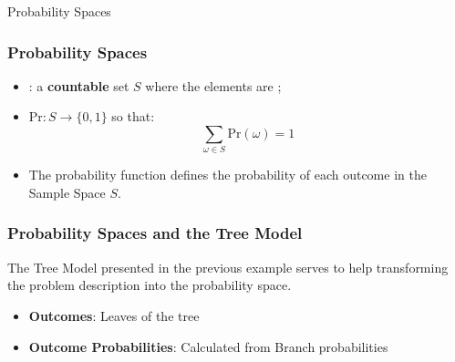 \documentclass{beamer}
\begin{document}
\begin{frame}
  \begin{center}
    {\huge
      Probability Spaces
    }
  \end{center}
\end{frame}

\begin{frame}
  \frametitle{Probability Spaces}

  {\large
    \begin{itemize}
    \item {}: a {\bf countable} set $S$ where the
      elements are ;
      \bigskip

    \item {} $\text{Pr}: S \to
      \{0,1\}$ so that:
      \begin{equation*}
        \sum_{\omega \in S}\text{Pr}(\omega) = 1
      \end{equation*}

      \bigskip
    \item The probability function defines the probability of each
      outcome in the Sample Space $S$.
      \bigskip

    \end{itemize}
  }
\end{frame}

\begin{frame}
  \frametitle{Probability Spaces and the Tree Model}

  {\larger The Tree Model presented in the previous example serves to
    help transforming the problem description into the probability
    space.
    \bigskip

    \begin{itemize}
    \item {\bf Outcomes}: Leaves of the tree
    \item {\bf Outcome Probabilities}: Calculated from Branch probabilities
    \end{itemize}

  }
\end{frame}
\end{document}
